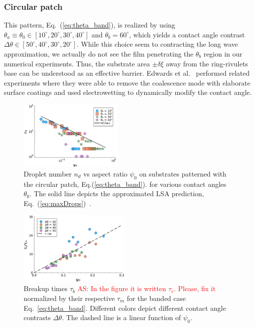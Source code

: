 \documentclass[twoside,twocolumn,9pt]{article}
\begin{document}
\subsubsection{Circular patch}\label{subsubsec:banded}
This pattern, Eq.~(\ref{eq:theta_band}), is realized by using $\theta_a \equiv \theta_0 \in [10^{\circ}, 20^{\circ}, 30^{\circ}, 40^{\circ}]$ and $\theta_b = 60^{\circ}$, which yields a contact angle contrast $\Delta\theta \in [50^{\circ}, 40^{\circ}, 30^{\circ}, 20^{\circ}]$.
While this choice seem to contracting the long wave approximation, we actually do not see the film penetrating the $\theta_b$ region in our numerical experiments.
Thus, the substrate area $\pm\delta\xi$ away from the ring-rivulets base can be understood as an effective barrier. 
Edwards et al.~\cite{edwardsControllingBreakupToroidal2021} performed related experiments where they were able to remove the coalescence mode with elaborate surface coatings and used electrowetting to dynamically modify the contact angle.
\begin{figure}
    \centering
    \includegraphics[width=0.45\textwidth]{assets/Ndrops_ban_new.pdf}    
    \caption{Droplet number $n_d$ vs aspect ratio $\psi_0$ on substrates patterned with 
    the circular patch, Eq.(\ref{eq:theta_band}).
    for various contact angles $\theta_0$. The solid line depicts the 
    approximated LSA prediction, Eq.~(\ref{eq:maxDrops})~\cite{gonzalezStabilityLiquidRing2013}.}
    \label{fig:max_drops}
\end{figure}
\begin{figure}
    \centering
    \includegraphics[width=0.48\textwidth]{assets/bandBreakup_timescales.pdf}
    \caption{Breakup times $\tau_b$ \textcolor{red}{AS: In the figure it is written $\tau_r$. Please, fix it} normalized by their respective $\tau_m$ for the banded case Eq.~\ref{eq:theta_band}.
    Different colors depict different contact angle contrasts $\Delta\theta$.
    The dashed line is a linear function of $\psi_0$. %
    }
    \label{fig:bandBreakupT}
\end{figure}
\end{document}
